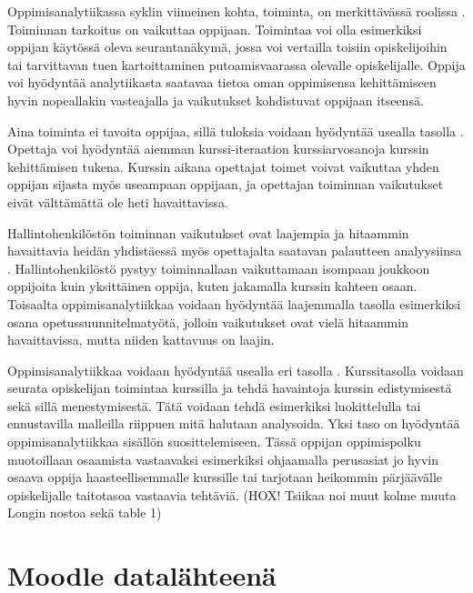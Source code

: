 Oppimisanalytiikassa syklin viimeinen kohta, toiminta, on merkittävässä roolissa \citep{clowLearningAnalyticsCycle2012}. Toiminnan tarkoitus on vaikuttaa oppijaan. Toimintaa voi olla esimerkiksi oppijan käytössä oleva seurantanäkymä, jossa voi vertailla toisiin opiskelijoihin tai tarvittavan tuen kartoittaminen putoamisvaarassa olevalle opiskelijalle. Oppija voi hyödyntää analytiikasta saatavaa tietoa oman oppimisensa kehittämiseen hyvin nopeallakin vasteajalla ja vaikutukset kohdistuvat oppijaan itseensä.

Aina toiminta ei tavoita oppijaa, sillä tuloksia voidaan hyödyntää usealla tasolla \citep{clowLearningAnalyticsCycle2012}. Opettaja voi hyödyntää aiemman kurssi-iteraation kurssiarvosanoja kurssin kehittämisen tukena. Kurssin aikana opettajat toimet voivat vaikuttaa yhden oppijan sijasta myös useampaan oppijaan, ja opettajan toiminnan vaikutukset eivät välttämättä ole heti havaittavissa.

Hallintohenkilöstön toiminnan vaikutukset ovat laajempia ja hitaammin havaittavia heidän yhdistäessä myös opettajalta saatavan palautteen analyysiinsa \citep{clowLearningAnalyticsCycle2012}. Hallintohenkilöstö pystyy toiminnallaan vaikuttamaan isompaan joukkoon oppijoita kuin yksittäinen oppija, kuten jakamalla kurssin kahteen osaan. Toisaalta oppimisanalytiikkaa voidaan hyödyntää laajemmalla tasolla esimerkiksi osana opetussuunnitelmatyötä, jolloin vaikutukset ovat vielä hitaammin havaittavissa, mutta niiden kattavuus on laajin. \citep{clowOverviewLearningAnalytics2013}

Oppimisanalytiikkaa voidaan hyödyntää usealla eri tasolla \citep{longPenetratingFogAnalytics2011,siemensLearningAnalyticsEmergence2013}. Kurssitasolla voidaan seurata opiskelijan toimintaa kurssilla ja tehdä havaintoja kurssin edistymisestä sekä sillä menestymisestä. Tätä voidaan tehdä esimerkiksi luokittelulla tai ennustavilla malleilla riippuen mitä halutaan analysoida. Yksi taso on hyödyntää oppimisanalytiikkaa sisällön suosittelemiseen. Tässä oppijan oppimispolku muotoillaan osaamista vastaavaksi esimerkiksi ohjaamalla perusasiat jo hyvin osaava oppija haasteellisemmalle kurssille tai tarjotaan heikommin pärjäävälle opiskelijalle taitotasoa vastaavia tehtäviä. \color{red}(HOX! Tsiikaa noi muut kolme muuta Longin nostoa sekä table 1)\color{black}

\section{Moodle datalähteenä}

